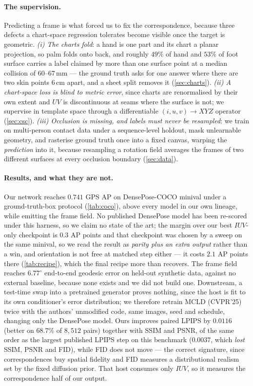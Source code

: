 \paragraph{The supervision.}
Predicting a frame is what forced us to fix the correspondence, because three defects a chart-space
regression tolerates become visible once the target is geometric. \emph{(i) The charts fold}: a
hand is one part and its chart a planar projection, so palm folds onto back, and roughly $49\%$ of
hand and $53\%$ of foot surface carries a label claimed by more than one surface point at a median
collision of $60$--$67$\,mm --- the ground truth asks for one answer where there are two skin points
$6$\,cm apart, and a sheet split removes it (\cref{sec:charts}). \emph{(ii) A chart-space loss is
blind to metric error}, since charts are renormalised by their own extent and $UV$ is discontinuous
at seams where the surface is not; we supervise in template space through a differentiable
$(i,u,v)\!\rightarrow\!XYZ$ operator (\cref{sec:csc}). \emph{(iii) Occlusion is missing, and labels
must never be resampled}: we train on multi-person contact data under a sequence-level holdout,
mask unlearnable geometry, and rasterise ground truth once into a fixed canvas, warping the
\emph{prediction} into it, because resampling a rotation field averages the frames of two different
surfaces at every occlusion boundary (\cref{sec:data}).

\paragraph{Results, and what they are not.}
Our network reaches $0.741$ GPS AP on DensePose-COCO minival under a ground-truth-box protocol
(\cref{tab:coco}), above every model in our own lineage, while emitting the frame field. No
published DensePose model has been re-scored under this harness, so we claim no state of the art;
the margin over our best $IUV$-only checkpoint is $0.3$ AP points and that checkpoint was chosen by
a sweep on the same minival, so we read the result as \emph{parity plus an extra output} rather
than a win, and orientation is not free at matched step either --- it costs $2.1$ AP points there
(\cref{tab:recipe}), which the final recipe more than recovers. The frame field reaches
$6.77^\circ$ end-to-end geodesic error on held-out synthetic data, against no external baseline,
because none exists and we did not build one. Downstream, a test-time swap into a pretrained
generator proves nothing, since the host is fit to its own conditioner's error distribution; we
therefore retrain MCLD (CVPR'25)~\cite{mcld2025} twice with the authors' unmodified code, same
images, seed and schedule, changing only the DensePose model. Ours improves paired LPIPS by
$0.0116$ (better on $68.7\%$ of $8{,}512$ pairs) together with SSIM and PSNR, of the same order as
the largest published LPIPS step on this benchmark ($0.0037$, which \emph{lost} SSIM, PSNR and
FID), while FID does not move --- the correct signature, since correspondences buy spatial fidelity
and FID measures a distributional realism set by the fixed diffusion prior. That host consumes only
$IUV$, so it measures the correspondence half of our output.

